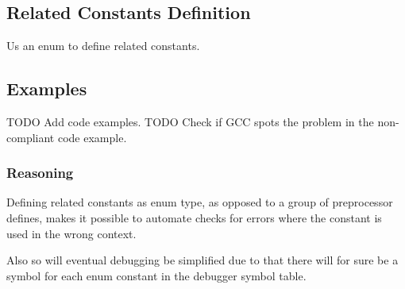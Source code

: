 \subsection{Related Constants Definition}

Us an enum to define related constants.

\subsection{Examples}

TODO Add code examples.
TODO Check if GCC spots the problem in the non-compliant code example.

\subsubsection{Reasoning}

Defining related constants as enum type, as opposed to a group of preprocessor defines, makes it possible to automate checks for errors where the constant is used in the wrong context.

Also so will eventual debugging be simplified due to that there will for sure be a symbol for each enum constant in the debugger symbol table.
